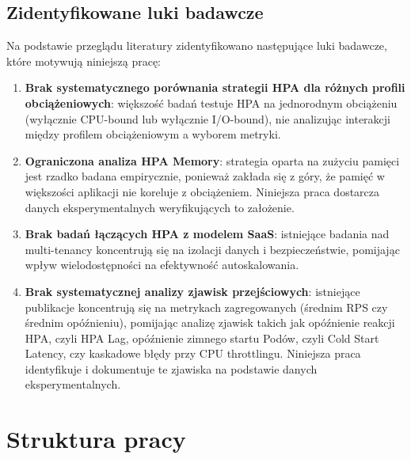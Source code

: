 \subsection{Zidentyfikowane luki badawcze}

Na podstawie przeglądu literatury zidentyfikowano następujące luki badawcze, które motywują niniejszą pracę:

\begin{enumerate}
  \item \textbf{Brak systematycznego porównania strategii HPA dla różnych profili obciążeniowych}: większość badań testuje HPA na jednorodnym obciążeniu (wyłącznie CPU-bound lub wyłącznie I/O-bound), nie analizując interakcji między profilem obciążeniowym a wyborem metryki.

  \item \textbf{Ograniczona analiza HPA Memory}: strategia oparta na zużyciu pamięci jest rzadko badana empirycznie, ponieważ zakłada się z góry, że pamięć w większości aplikacji nie koreluje z obciążeniem. Niniejsza praca dostarcza danych eksperymentalnych weryfikujących to założenie.

  \item \textbf{Brak badań łączących HPA z modelem SaaS}: istniejące badania nad multi-tenancy koncentrują się na izolacji danych i bezpieczeństwie, pomijając wpływ wielodostępności na efektywność autoskalowania.

  \item \textbf{Brak systematycznej analizy zjawisk przejściowych}: istniejące publikacje koncentrują się na metrykach zagregowanych (średnim RPS czy średnim opóźnieniu), pomijając analizę zjawisk takich jak opóźnienie reakcji HPA, czyli HPA Lag, opóźnienie zimnego startu Podów, czyli Cold Start Latency, czy kaskadowe błędy przy CPU throttlingu. Niniejsza praca identyfikuje i dokumentuje te zjawiska na podstawie danych eksperymentalnych.
\end{enumerate}

\section{Struktura pracy}

